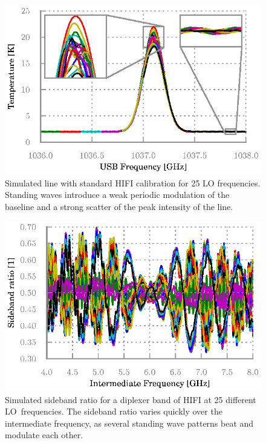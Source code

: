 \documentclass[journal]{IEEEtran}
\begin{document}
\begin{figure}
    \centering
    \includegraphics[width=\columnwidth]{bb-on_corrected-2}
    \caption{Simulated line with standard HIFI calibration for 25 LO frequencies.
    Standing waves introduce a weak periodic modulation of the baseline and a strong scatter of the peak intensity of the line.}%
    \label{fig:calibrated_std}
\end{figure}

\begin{figure}
    \centering
    \includegraphics[width=\columnwidth]{sbr}
    \caption{Simulated sideband ratio for a diplexer band of HIFI at 25 different LO~frequencies.
    The sideband ratio varies quickly over the intermediate frequency, as several standing wave patterns beat and modulate each other.}%
    \label{fig:sbr}
\end{figure}
\end{document}
